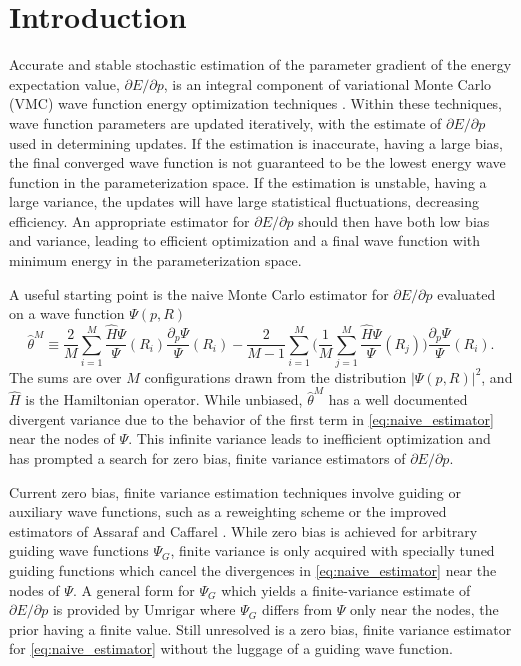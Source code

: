 \documentclass{article}
\begin{document}
\section{Introduction}
Accurate and stable stochastic estimation of the parameter gradient of the energy expectation value, $\partial E/\partial p$, is an integral component of variational Monte Carlo (VMC) wave function energy optimization techniques \cite{PhysRevB.64.024512, doi:10.1063/1.1604379, Toulouse2007}.
Within these techniques, wave function parameters are updated iteratively, with the estimate of $\partial E/\partial p$ used in determining updates.
If the estimation is inaccurate, having a large bias, the final converged wave function is not guaranteed to be the lowest energy wave function in the parameterization space.
If the estimation is unstable, having a large variance, the updates will have large statistical fluctuations, decreasing efficiency.
An appropriate estimator for $\partial E/ \partial p$ should then have both low bias and variance, leading to efficient optimization and a final wave function with minimum energy in the parameterization space.

A useful starting point is the naive Monte Carlo estimator for $\partial E/\partial p$ evaluated on a wave function $\Psi(p, R)$ 
\begin{equation}
\hat{\theta}^M \equiv \frac{2}{M}\sum_{i=1}^M \frac{\hat{H}\Psi}{\Psi}(R_i) \frac{\partial_p \Psi}{\Psi}(R_i) - \frac{2}{M-1} \sum_{i=1}^M \Big(\frac{1}{M} \sum_{j=1}^M \frac{\hat{H}\Psi}{\Psi}(R_j)\Big)\frac{\partial_p \Psi}{\Psi}(R_i). \label{eq:naive_estimator}
\end{equation}
The sums are over $M$ configurations drawn from the distribution $|\Psi(p, R)|^2$, and $\hat{H}$ is the Hamiltonian operator.
While unbiased, $\hat{\theta}^M$ has a well documented divergent variance \cite{Avella} due to the behavior of the first term in \eqref{eq:naive_estimator} near the nodes of $\Psi$.
This infinite variance leads to inefficient optimization and has prompted a search for zero bias, finite variance estimators of $\partial E/\partial p$.

Current zero bias, finite variance estimation techniques involve guiding or auxiliary wave functions, such as a reweighting scheme \cite{Avella, Attaccalite2008} or the improved estimators of Assaraf and Caffarel \cite{doi:10.1063/1.1286598, Assaraf2003}.
While zero bias is achieved for arbitrary guiding wave functions $\Psi_G$, finite variance is only acquired with specially tuned guiding functions which cancel the divergences in \eqref{eq:naive_estimator} near the nodes of $\Psi$.
A general form for $\Psi_G$ which yields a finite-variance estimate of $\partial E/\partial p$ is provided by Umrigar \cite{doi:10.1063/1.4933112} where $\Psi_G$ differs from $\Psi$ only near the nodes, the prior having a finite value.
Still unresolved is a zero bias, finite variance estimator for \eqref{eq:naive_estimator} without the luggage of a guiding wave function. 
\end{document}
